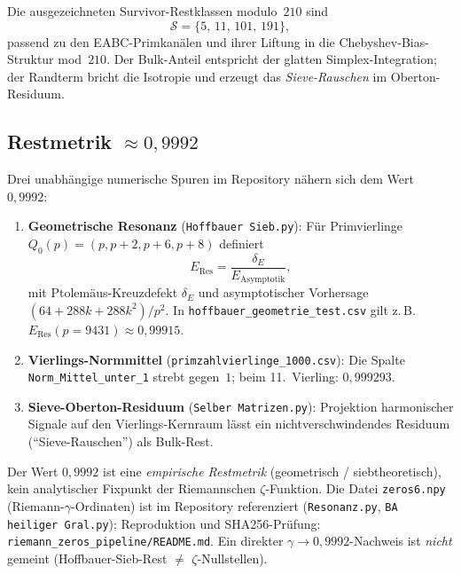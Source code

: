 \documentclass[12pt,a4paper]{article}
\begin{document}
Die ausgezeichneten Survivor-Restklassen modulo~$210$ sind
\[
\mathcal{S}=\{5,\,11,\,101,\,191\},
\]
passend zu den EABC-Primkanälen und ihrer Liftung in die
Chebyshev-Bias-Struktur mod~$210$.
Der Bulk-Anteil entspricht der glatten Simplex-Integration;
der Randterm bricht die Isotropie und erzeugt das
\emph{Sieve-Rauschen} im Oberton-Residuum.

\subsection{Restmetrik $\approx 0{,}9992$}

Drei unabhängige numerische Spuren im Repository nähern sich
dem Wert $0{,}9992$:

\begin{enumerate}[nosep]
  \item \textbf{Geometrische Resonanz} (\texttt{Hoffbauer Sieb.py}):
        Für Primvierlinge $Q_0(p)=(p,p+2,p+6,p+8)$ definiert
        \[
        E_{\mathrm{Res}}=\frac{\delta_E}{E_{\mathrm{Asymptotik}}},
        \]
        mit Ptolemäus-Kreuzdefekt $\delta_E$ und asymptotischer
        Vorhersage $(64+288k+288k^2)/p^2$.
        In \texttt{hoffbauer\_geometrie\_test.csv} gilt z.\,B.\
        $E_{\mathrm{Res}}(p=9431)\approx 0{,}99915$.
  \item \textbf{Vierlings-Normmittel} (\texttt{primzahlvierlinge\_1000.csv}):
        Die Spalte \texttt{Norm\_Mittel\_unter\_1} strebt gegen~$1$;
        beim 11.\ Vierling: $0{,}999293$.
  \item \textbf{Sieve-Oberton-Residuum} (\texttt{Selber Matrizen.py}):
        Projektion harmonischer Signale auf den Vierlings-Kernraum
        lässt ein nichtverschwindendes Residuum (``Sieve-Rauschen'')
        als Bulk-Rest.
\end{enumerate}

\begin{tcolorbox}[numerisch]
Der Wert $0{,}9992$ ist eine \emph{empirische Restmetrik}
(geometrisch / siebtheoretisch), kein analytischer Fixpunkt
der Riemannschen $\zeta$-Funktion.
Die Datei \texttt{zeros6.npy} (Riemann-$\gamma$-Ordinaten) ist
im Repository referenziert (\texttt{Resonanz.py}, \texttt{BA heiliger Gral.py});
Reproduktion und SHA256-Prüfung: \texttt{riemann\_zeros\_pipeline/README.md}.
Ein direkter $\gamma\to 0{,}9992$-Nachweis ist \emph{nicht} gemeint
(Hoffbauer-Sieb-Rest $\neq$ $\zeta$-Nullstellen).
\end{tcolorbox}

\end{document}
